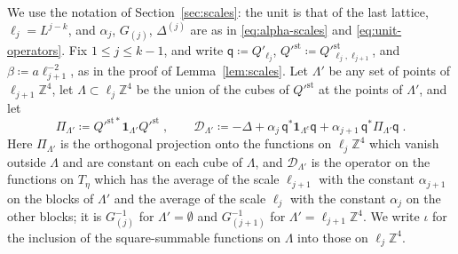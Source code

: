 \documentclass[11pt]{preprint}
\numberwithin{equation}{section}
\theoremstyle{definition}
\theoremstyle{remark}
\theoremstyle{plain}
\begin{document}
We use the notation of Section~\ref{sec:scales}: the unit is that of the last lattice, $\ell_j = L^{j-k}$, and $\alpha_j$, $G_{(j)}$, $\Delta^{(j)}$ are as in \eqref{eq:alpha-scales} and \eqref{eq:unit-operators}. Fix $1 \leq j \leq k - 1$, and write $\mathsf q \coloneqq Q'_{\ell_j}$, $Q'^{\mathrm{st}} \coloneqq Q'^{\mathrm{st}}_{\ell_j,\ell_{j+1}}$, and $\beta \coloneqq a\ell_{j+1}^{-2}$, as in the proof of Lemma~\ref{lem:scales}. Let $\Lambda'$ be any set of points of $\ell_{j+1}\mathbb Z^4$, let $\Lambda \subset \ell_j\mathbb Z^4$ be the union of the cubes of $Q'^{\mathrm{st}}$ at the points of $\Lambda'$, and let
\begin{equation}\label{eq:two-scale-operator}
    \Pi_{\Lambda'} \coloneqq Q'^{\mathrm{st}*}\mathbf 1_{\Lambda'}Q'^{\mathrm{st}}\;,
    \qquad
    \mathcal D_{\Lambda'} \coloneqq -\Delta + \alpha_j\,\mathsf q^*\mathbf 1_{\Lambda^c}\mathsf q + \alpha_{j+1}\,\mathsf q^*\Pi_{\Lambda'}\mathsf q\;.
\end{equation}
Here $\Pi_{\Lambda'}$ is the orthogonal projection onto the functions on $\ell_j\mathbb Z^4$ which vanish outside $\Lambda$ and are constant on each cube of $\Lambda$, and $\mathcal D_{\Lambda'}$ is the operator on the functions on $T_\eta$ which has the average of the scale $\ell_{j+1}$ with the constant $\alpha_{j+1}$ on the blocks of $\Lambda'$ and the average of the scale $\ell_j$ with the constant $\alpha_j$ on the other blocks; it is $G_{(j)}^{-1}$ for $\Lambda' = \emptyset$ and $G_{(j+1)}^{-1}$ for $\Lambda' = \ell_{j+1}\mathbb Z^4$. We write $\iota$ for the inclusion of the square-summable functions on $\Lambda$ into those on $\ell_j\mathbb Z^4$.
\end{document}
